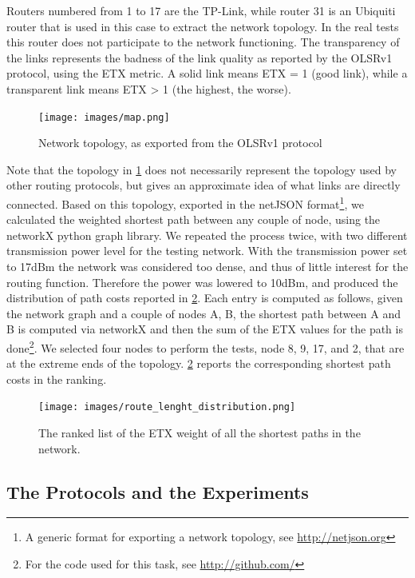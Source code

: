 \documentclass[10pt,onecolumn]{paper}
\begin{document}
Routers numbered from 1 to 17 are the TP-Link, while router 31 is an Ubiquiti
router that is used in this case to extract the network topology. In the real
tests this router does not participate to the network functioning. The
transparency of the links represents the badness of the link quality as reported
by the OLSRv1 protocol, using the ETX metric\cite{ETX}. A solid link means ETX =
1 (good link), while a transparent link means ETX > 1 (the highest, the worse).


\begin{figure}
  \centering
  \texttt{[image: images/map.png]}
  \caption{Network topology, as exported from the OLSRv1 protocol} 
  \label{fig:topo}
\end{figure}%

Note that the topology in \cref{fig:topo} does not necessarily represent the
topology used by other routing protocols, but gives an approximate idea of what
links are directly connected. Based on this topology, exported in the netJSON
format\footnote{A generic format for exporting a network topology, see
\url{http://netjson.org}}, we calculated the weighted shortest path between any couple of node,
using the networkX python graph
library. We repeated the process twice, with two different transmission power
level for the testing network. With the transmission power set to 17dBm the
network was considered too dense, and thus of little interest for the routing
function. Therefore the power was lowered to 10dBm, and produced the
distribution of path costs reported in \cref{fig:ETXrank}. Each entry is computed
as follows, given the network graph and a couple of nodes A, B, the shortest
path between A and B is computed via networkX and then the sum of the ETX values
for the path is done\footnote{For the code used for this task, see
\url{http://github.com/}}. We selected four nodes
to perform the tests, node 8, 9, 17, and 2, that are at the extreme ends of the
topology. \cref{fig:ETXrank} reports the corresponding shortest path costs in
the ranking.

\begin{figure}
  \centering
  \texttt{[image: images/route\_lenght\_distribution.png]}
  \caption{The ranked list of the ETX weight of all the shortest paths in the
    network.} 
  \label{fig:ETXrank}
\end{figure}

\subsection{The Protocols and the Experiments}
\end{document}
